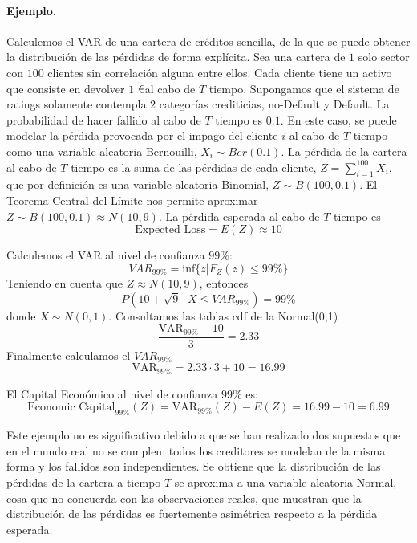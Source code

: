 \paragraph{Ejemplo.} Calculemos el VAR de una cartera de cr\'editos
sencilla, de la que se puede obtener la distribuci\'on de las p\'erdidas de
forma expl\'icita. Sea una cartera de $1$ solo sector con $100$ clientes sin
correlaci\'on alguna entre ellos. Cada cliente tiene un activo que consiste en
devolver $1$ \euro al cabo de $T$ tiempo. Supongamos que el sistema de ratings
solamente contempla $2$ categor\'ias crediticias, no-Default y Default. La
probabilidad de hacer fallido al cabo de $T$ tiempo es $0.1$.
\newline
\newline
En este caso, se puede modelar la p\'erdida provocada por el impago del cliente
$i$ al cabo de $T$ tiempo como una variable aleatoria Bernouilli, $X_i \sim Ber(0.1)$.
La p\'erdida de la cartera al cabo de $T$ tiempo es la suma de las p\'erdidas de
cada cliente, $Z = \sum_{i=1}^{100} X_i$, que por definici\'on es una
variable aleatoria Binomial, $Z \sim B(100,0.1)$. El Teorema Central del
L\'imite nos permite aproximar $Z \sim B(100,0.1) \approx N(10, 9)$.
\newline
\newline
La p\'erdida esperada al cabo de $T$ tiempo es
\begin{displaymath}
\textrm{Expected Loss} = E(Z) \approx 10
\end{displaymath}

Calculemos el VAR al nivel de confianza $99\%$:
\begin{displaymath}
VAR_{99\%} = \textrm{inf}\{z | F_Z(z) \leq 99\%\}
\end{displaymath}
Teniendo en cuenta que $Z \approx N(10, 9)$, entonces
\begin{displaymath}
P(10 + \sqrt{9} \cdot X \leq VAR_{99\%}) = 99\%
\end{displaymath}
donde $X \sim N(0,1)$. Consultamos las tablas cdf de la Normal(0,1)
\begin{displaymath}
\frac{\textrm{VAR}_{99\%} - 10}{3} = 2.33
\end{displaymath}
Finalmente calculamos el $VAR_{99\%}$
\begin{displaymath}
\textrm{VAR}_{99\%} = 2.33 \cdot 3 + 10 = 16.99
\end{displaymath}

El Capital Econ\'omico al nivel de confianza $99\%$ es:
\begin{displaymath}
\textrm{Economic Capital}_{99\%}(Z) = \textrm{VAR}_{99\%}(Z) - E(Z) = 16.99 - 10 = 6.99
\end{displaymath}

Este ejemplo no es significativo debido a que se han realizado dos supuestos
que en el mundo real no se cumplen: todos los creditores se modelan de la misma 
forma y los fallidos son independientes. Se obtiene que la distribuci\'on de las 
p\'erdidas de la cartera a tiempo $T$ se aproxima a una variable aleatoria Normal,
cosa que no concuerda con las observaciones reales, que muestran que la
distribuci\'on de las p\'erdidas es fuertemente asim\'etrica respecto a la p\'erdida
esperada.

